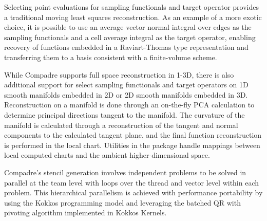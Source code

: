 Selecting point evaluations for sampling functionals and target operator provides a traditional moving least squares reconstruction. As an example of a more exotic choice, it is possible to use an average vector normal integral over edges as the sampling functionals and a cell average integral as the target operator, enabling recovery of functions embedded in a Raviart-Thomas type representation and transferring them to a basis consistent with a finite-volume scheme.

While Compadre supports full space reconstruction in 1-3D, there is also additional support for select sampling functionals and target operators on 1D smooth manifolds embedded in 2D or 2D smooth manifolds embedded in 3D. Reconstruction on a manifold is done through an on-the-fly PCA calculation to determine principal directions tangent to the manifold. The curvature of the manifold is calculated through a reconstruction of the tangent and normal components to the calculated tangent plane, and the final function reconstruction is performed in the local chart. Utilities in the package handle mappings between local computed charts and the ambient higher-dimensional space.

Compadre's stencil generation involves independent problems to be solved in parallel at the team level with loops over the thread and vector level within each problem. This hierarchical parallelism is achieved with performance portability by using the Kokkos programming model and leveraging the batched QR with pivoting algorithm implemented in Kokkos Kernels. 